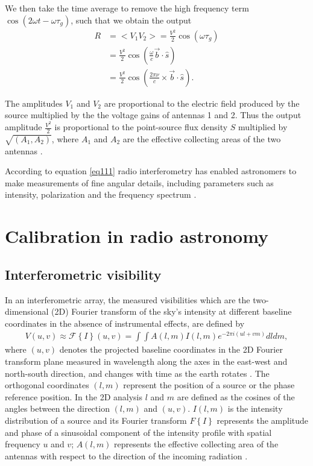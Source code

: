 We then take the time average to remove the high frequency term $\cos(2\omega t - \omega \tau_{g})$, such that we obtain the output 
\begin{align}
R&= <V_1V_2> = \frac{V^2}{2}  \cos (\omega\tau_{g})\\
  &= \frac{V^2}{2}  \cos \left( \frac{\omega}{c} \overrightarrow{b} \cdot \widehat{s} \right)\\
   &= \frac{V^2}{2}  \cos \left( \frac{2\pi \nu}{c} \times
   \overrightarrow{b} \cdot \widehat{s} \right). 
\end{align}

The amplitudes $V_1$ and $V_2$ are proportional to the electric field produced by the  source multiplied by the the voltage gains of antennas 1 and 2. Thus the output amplitude $\frac{V^2}{2}$ is proportional to the point-source flux density $S$ multiplied by $\sqrt{(A_1, A_2)}$, where $A_1$ and $A_2$ are the effective collecting areas of the two antennas \citep{NRAO}.

According to equation \ref{eq111} 
radio interferometry has enabled astronomers to make measurements of fine angular  details, including parameters such as intensity, polarization and the frequency spectrum \citep{thompson2001interferometry}.

\section{Calibration in radio astronomy}
\label{Calibr}
\subsection{Interferometric visibility}
In an interferometric array, the measured visibilities  which are the two-dimensional (2D) Fourier transform of the sky's intensity at different baseline coordinates in the absence of instrumental effects, are defined by
\begin{align}
V(u,v)\approx \mathcal{F}\left\{I\right\}(u,v)=\int \int A(l,m) I (l,m)e^{-2\pi i(ul+vm)} dl dm,
\label{Vis}
\end{align}
where $(u,v)$ denotes the projected baseline coordinates in the 2D Fourier transform plane  measured in wavelength along the axes in the east-west and north-south direction, and changes with time as the earth rotates  \citep{taylor1999synthesis}. The orthogonal coordinates $(l, m)$ represent the position of a source or the phase reference position. In the 2D analysis $l$ and $m$ are defined as the cosines of the  angles between the direction $(l,m)$ and $(u, v)$. $I(l,m)$ is the intensity distribution of a source and its Fourier transform  ${F}\left\{I\right\}$ represents the amplitude and phase of a sinusoidal component of the intensity profile with spatial frequency $u$ and $v$; $A(l, m)$ represents the effective collecting area of the antennas with respect to the direction of the incoming radiation \citep{thompson2001interferometry}.

